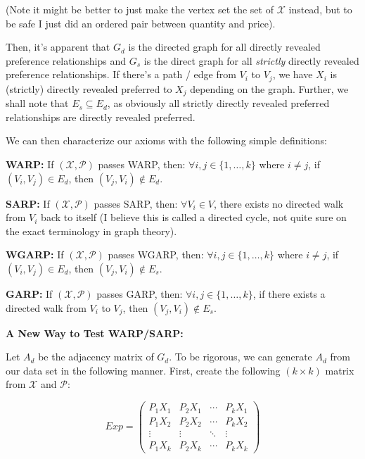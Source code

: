\documentclass{article} %
\begin{document}
(Note it might be better to just make the vertex set the set of $\mathcal{X}$ instead, but to be safe I just did an ordered pair between quantity and price).


Then, it's apparent that $G_d$ is the directed graph for all directly revealed preference relationships and $G_s$ is the direct graph for all \textit{strictly} directly revealed preference relationships. If there's a path / edge from $V_i$ to $V_j$, we have $X_i$ is (strictly) directly revealed preferred to $X_j$ depending on the graph. Further, we shall note that $E_s\subseteq E_d$, as obviously all strictly directly revealed preferred relationships are directly revealed preferred.


We can then characterize our axioms with the following simple definitions:


\textbf{WARP:} If $(\mathcal{X},\mathcal{P})$ passes WARP, then: $\forall i,j\in\{1,\dots,k\}$ where $i\not=j$, if $(V_i,V_j)\in E_d$, then $(V_j, V_i)\not\in E_d$.


\textbf{SARP:} If $(\mathcal{X},\mathcal{P})$ passes SARP, then: $\forall V_i \in V$, there exists no directed walk from $V_i$ back to itself (I believe this is called a directed cycle, not quite sure on the exact terminology in graph theory).


\textbf{WGARP:} If $(\mathcal{X},\mathcal{P})$ passes WGARP, then: $\forall i,j\in\{1,\dots,k\}$ where $i\not=j$, if $(V_i,V_j)\in E_d$, then $(V_j, V_i)\not\in E_s$.


\textbf{GARP:} If $(\mathcal{X},\mathcal{P})$ passes GARP, then: $\forall i,j\in\{1,\dots,k\}$, if there exists a directed walk from $V_i$ to $V_j$, then $(V_j,V_i)\not\in E_s$.


\textbf{A New Way to Test WARP/SARP:} 

Let $A_d$ be the adjacency matrix of $G_d$. To be rigorous, we can generate $A_d$ from our data set in the following manner. First, create the following $(k\times k)$ matrix from $\mathcal{X}$ and $\mathcal{P}$:

\[
Exp = 
 \begin{pmatrix}
  P_1X_1 & P_2X_1 & \cdots & P_kX_1 \\
  P_1X_2 & P_2X_2 & \cdots & P_kX_2 \\
  \vdots  & \vdots  & \ddots & \vdots  \\
  P_1X_k & P_2X_k & \cdots & P_kX_k
 \end{pmatrix}
\]
\end{document}
